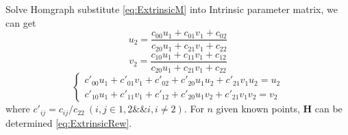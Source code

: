 \documentclass[14pt,hyperref={CJKbookmarks=true}]{beamer}
\theoremstyle{plain}
\theoremstyle{definition}
\theoremstyle{remark}
\begin{document}
\begin{frame}
\begin{columns}[onlytextwidth]
\begin{column}{0.5\textwidth}
\begin{block}{Solve Homgraph }
substitute \eqref{eq:ExtrinsicM} into Intrinsic parameter matrix, we can get
\begin{equation}\label{eq:Extrinsicu^*}
u_2  = \frac{c_{00}u_1+c_{01}v_1+c_{02}}{c_{20}u_1+c_{21}v_1+c_{22}}
\end{equation}
\begin{equation}\label{eq:Extrinsicv^*}
v_2  = \frac{c_{10}u_1+c_{11}v_1+c_{12}}{c_{20}u_1+c_{21}v_1+c_{22}}
\end{equation}
\begin{equation}\label{eq:ExtrinsicRew}
\begin{cases}
c'_{00}u_1+c'_{01}v_1+c'_{02} + c'_{20}u_1u_2+c'_{21}v_1u_2=u_2\\
c'_{10}u_1+c'_{11}v_1+c'_{12} + c'_{20}u_1v_2+c'_{21}v_1v_2=v_2
\end{cases}
\end{equation}
where $c'_{ij}=c_{ij}/c_{22}\ (i,j \in{1,2}\&\&i,i\neq2)$. For $n$ given known points, $\mathbf{H}$ can be determined \eqref{eq:ExtrinsicRew}.
\end{block}
\end{column}
\end{columns}
\end{frame}
\end{document}
